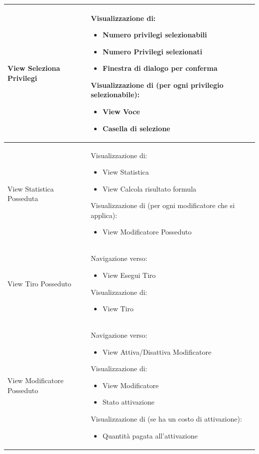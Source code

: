 \documentclass[a4paper, 11pt]{article}
\begin{document}
\begin{adjustwidth}{-1.5cm}{-1.5cm}
\begin{center}
\begin{longtable}{|p{5cm}|p{5cm}|p{5cm}|}
        View Seleziona Privilegi & Visualizzazione di:
        \begin{itemize}
            \item Numero privilegi selezionabili
            \item Numero Privilegi selezionati
            \item Finestra di dialogo per conferma
        \end{itemize}
        Visualizzazione di (per ogni privilegio selezionabile):
        \begin{itemize}
            \item View Voce
            \item Casella di selezione
        \end{itemize} &  \\ \hline
        
        View Statistica Posseduta & Visualizzazione di:
        \begin{itemize}
            \item View Statistica
            \item View Calcola risultato formula
        \end{itemize}
        Visualizzazione di (per ogni modificatore che si applica):
        \begin{itemize}
            \item View Modificatore Posseduto
        \end{itemize} &  \\ \hline
        
        View Tiro Posseduto & Navigazione verso:
        \begin{itemize}
            \item View Esegui Tiro
        \end{itemize}
        Visualizzazione di:
        \begin{itemize}
            \item View Tiro
        \end{itemize} &  \\ \hline
        
        View Modificatore Posseduto & Navigazione verso:
        \begin{itemize}
            \item View Attiva/Disattiva Modificatore
        \end{itemize}
        Visualizzazione di:
        \begin{itemize}
            \item View Modificatore
            \item Stato attivazione
        \end{itemize}
        Visualizzazione di (se ha un costo di attivazione):
        \begin{itemize}
            \item Quantità pagata all’attivazione
        \end{itemize} &  \\ \hline
        

\end{longtable}
\end{center}
\end{adjustwidth}
\end{document}
